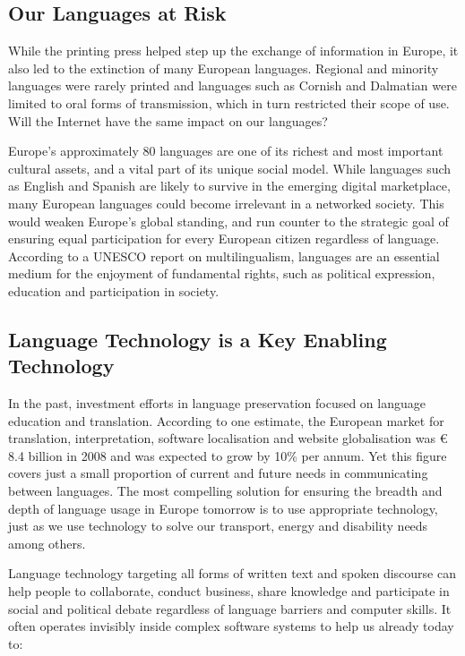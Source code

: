 \begin{multicols}{2}
\subsection{Our Languages at Risk}

While the printing press helped step up the exchange of information in Europe, it also led to the extinction of many European languages. Regional and minority languages were rarely printed and languages such as Cornish and Dalmatian were limited to oral forms of transmission, which in turn restricted their scope of use. Will the Internet have the same impact on our languages?


 Europe’s approximately 80 languages are one of its richest and most important cultural assets, and a vital part of its unique social model\cite{EC2}. While languages such as English and Spanish are likely to survive in the emerging digital marketplace, many European languages could become irrelevant in a networked society. This would weaken Europe’s global standing, and run counter to the strategic goal of ensuring equal participation for every European citizen regardless of language. According to a UNESCO report on multilingualism, languages are an essential medium for the enjoyment of fundamental rights, such as political expression, education and participation in society\cite{Unesco1}.

\subsection{Language Technology is a Key Enabling Technology}

  In the past, investment efforts in language preservation focused on language education and translation. According to one estimate, the  European market for translation, interpretation, software localisation and website globalisation was € 8.4 billion in 2008 and was expected to grow by 10\% per annum\cite{EC3}. Yet this figure covers just a small proportion of current and future needs in communicating between languages. The most compelling solution for ensuring the breadth and depth of language usage in Europe tomorrow is to use appropriate technology, just as we use technology to solve our transport, energy and disability needs among others.

Language technology targeting all forms of written text and spoken discourse can help people to collaborate, conduct business, share knowledge and participate in social and political debate regardless of language barriers and computer skills. It often operates invisibly inside complex software systems to help us already today to:


\end{multicols}
